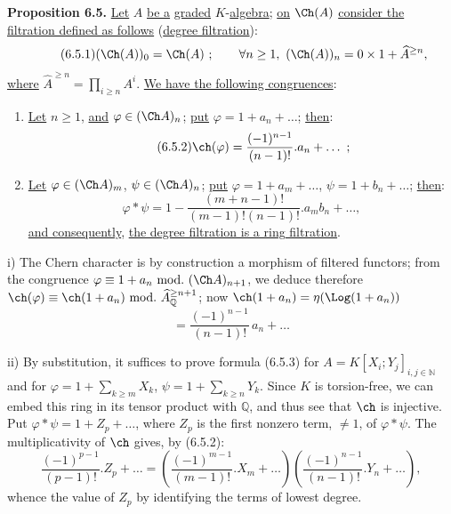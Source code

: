 \textbf{Proposition 6.5.} \uline{Let} \(A\) \uline{be a} \uline{graded} \(K\)-\uline{algebra}; \uline{on} \(\Ch(A)\) \uline{consider the filtration defined as follows} (\uline{degree filtration}):
\begin{equation}\tag{6.5.1}
  (\Ch(A))_0=\Ch(A)~;\qquad
  \forall n\ge1,\ (\Ch(A))_n=0\times 1+\widehat A^{\ge n},
\end{equation}
\uline{where} \(\widehat A^{\ge n}=\prod_{i\ge n}A^i\). \uline{We have the following congruences}:

\begin{enumerate}[label=\roman*)]
\item \uline{Let} \(n\ge1\), \uline{and} \(\varphi\in(\Ch A)_n\); \uline{put} \(\varphi=1+a_n+\ldots\); \uline{then}:
\begin{equation}\tag{6.5.2}
  \ch(\varphi)=\frac{(-1)^{n-1}}{(n-1)!}.a_n+\ldots~;
\end{equation}

\item \uline{Let} \(\varphi\in(\Ch A)_m\), \(\psi\in(\Ch A)_n\); \uline{put}
\(\varphi=1+a_m+\ldots\), \(\psi=1+b_n+\ldots\); \uline{then}:
\begin{equation}\tag{6.5.3}
  \varphi*\psi
  =
  1-\frac{(m+n-1)!}{(m-1)!(n-1)!}.a_m b_n+\ldots,
\end{equation}
\uline{and consequently}, \uline{the degree filtration is a ring filtration}.
\end{enumerate}

i) The Chern character is by construction a morphism of filtered functors; from the congruence \(\varphi\equiv1+a_n\ \mathrm{mod.}\ (\Ch A)_{n+1}\), we deduce
%
therefore \(\ch(\varphi)\equiv\ch(1+a_n)\ \mathrm{mod.}\ \widehat A_{\mathbb Q}^{\ge n+1}\); now \(\ch(1+a_n)=\eta(\Log(1+a_n))\)
\[
  =\frac{(-1)^{n-1}}{(n-1)!}\,a_n+\ldots
\]

ii) By substitution, it suffices to prove formula (6.5.3) for \(A=K[X_i;Y_j]_{i,j\in\mathbb N}\) and for \(\varphi=1+\sum_{k\ge m}X_k\), \(\psi=1+\sum_{k\ge n}Y_k\). Since \(K\) is torsion-free, we can embed this ring in its tensor product with \(\mathbb Q\), and thus see that \(\ch\) is injective. Put \(\varphi*\psi=1+Z_p+\ldots\), where \(Z_p\) is the first nonzero term, \(\neq1\), of \(\varphi*\psi\). The multiplicativity of \(\ch\) gives, by (6.5.2):
\[
  \frac{(-1)^{p-1}}{(p-1)!}.Z_p+\ldots
  =
  \left(\frac{(-1)^{m-1}}{(m-1)!}.X_m+\ldots\right)
  \left(\frac{(-1)^{n-1}}{(n-1)!}.Y_n+\ldots\right),
\]
whence the value of \(Z_p\) by identifying the terms of lowest degree.

